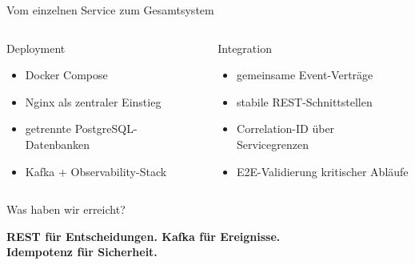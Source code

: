 \documentclass[aspectratio=169,11pt]{beamer}
\begin{document}
\begin{frame}{Vom einzelnen Service zum Gesamtsystem}
\begin{columns}[T,onlytextwidth]
\begin{block}{Deployment}
\begin{itemize}
  \item Docker Compose
  \item Nginx als zentraler Einstieg
  \item getrennte PostgreSQL-Datenbanken
  \item Kafka + Observability-Stack
\end{itemize}
\end{block}
\begin{block}{Integration}
\begin{itemize}
  \item gemeinsame Event-Verträge
  \item stabile REST-Schnittstellen
  \item Correlation-ID über Servicegrenzen
  \item E2E-Validierung kritischer Abläufe
\end{itemize}
\end{block}
\end{columns}
\end{frame}

\begin{frame}{Was haben wir erreicht?}
\centering
{}\par
\vspace{.65cm}
\begin{minipage}{.92\textwidth}
\centering
{\large\textbf{REST für Entscheidungen. Kafka für Ereignisse.}}\\[.25cm]
{\large\textbf{Idempotenz für Sicherheit.}}
\end{minipage}
\end{frame}
\end{document}
